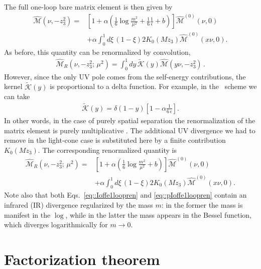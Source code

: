 The full one-loop bare matrix element is then given by
\begin{align}
\label{eq::pIoffe1loop}
    \widehat{\mathcal{M}}\left(\nu, -z_3^2\right) = & \left[1+ \alpha\left(\frac{1}{6}\log\frac{m^2}{\mu^2} + \frac{1}{6}\frac{1}{\epsilon} + b\right)  \right]\widehat{\mathcal{M}}^{(0)}\left(\nu, 0\right) \nonumber \\
    &+\alpha \int_0^1 d\xi\,\left(1-\xi\right)2K_0\left(M z_3\right)  \widehat{\mathcal{M}}^{(0)}\left(x \nu, 0\right).
\end{align}
As before, this quantity can be renormalized by convolution, 
\begin{align}
    \widehat{\mathcal{M}}_R\left(\nu, -z_3^2;\,\mu^2\right)= 
    \int_0^1 dy \, \tilde{\mathcal{K}}\left(y\right) \widehat{\mathcal{M}}\left(y\nu, -z_3^2\right)\, .
\end{align}
However, since the only UV pole comes from the self-energy contributions, the
kernel $\tilde{\mathcal{K}}\left(y\right)$ is proportional to a delta function.
For example, in the \msbar\ scheme we can take
\begin{align}
    \tilde{\mathcal{K}}\left(y\right) = 
    \delta\left(1-y\right)\left[ 1-\alpha \frac{1}{6\,\epsilon} \right].
\end{align}
In other words, in the case of purely spatial separation the renormalization of
the matrix element is purely multiplicative \cite{Ishikawa:2017faj}. The
additional UV divergence we had to remove in the light-cone case is substituted
here by a finite contribution $K_0\left(M z_3\right) $. The corresponding
renormalized quantity is
\begin{align}
\label{eq::pIoffe1loopren}
    \widehat{\mathcal{M}}_R\left(\nu, -z_3^2;\,\mu^2\right) =&
    \left[1+ \alpha\left(\frac{1}{6}\log\frac{m^2}{\mu^2} + b\right)  \right]\widehat{\mathcal{M}}^{(0)}\left(\nu, 0\right) \nonumber \\
    &+\alpha \int_0^1 d\xi\,\left(1-\xi\right)2K_0\left(M z_3\right)  \widehat{\mathcal{M}}^{(0)}\left(x \nu, 0\right).
\end{align}
Note also that both Eqs.~\eqref{eq::Ioffe1loopren} and \eqref{eq::pIoffe1loopren} contain an infrared (IR) divergence regularized by the mass $m$: 
in the former the mass is manifest in the $\log$, while in the latter the mass appears in the Bessel function, which diverges logarithmically for $m\rightarrow 0$.

\section{Factorization theorem}
\label{sec:factorization}

